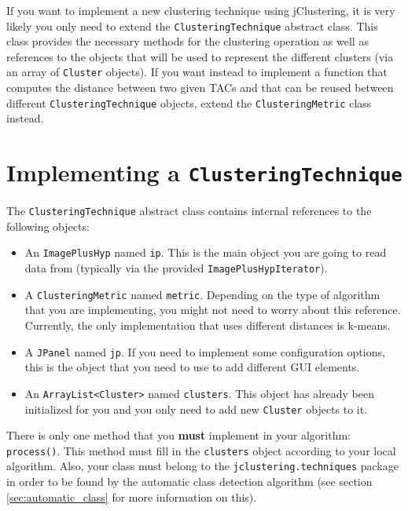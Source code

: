 \documentclass[11pt]{article} %
\begin{document}
If you want to implement a new clustering technique using jClustering, it is very likely you only need to extend the {\tt ClusteringTechnique} abstract class. This class provides the necessary methods for the clustering operation as well as references to the objects that will be used to represent the different clusters (via an array of {\tt Cluster} objects). If you want instead
to implement a function that computes the distance between two given TACs and that can be reused between different {\tt ClusteringTechnique} objects, extend the {\tt ClusteringMetric} class instead.

\section{Implementing a {\tt ClusteringTechnique}}
\label{sec:clusttech}

The {\tt ClusteringTechnique} abstract class contains internal references to the following objects:

\begin{itemize}
\item An {\tt ImagePlusHyp} named {\tt ip}. This is the main object you are going to read data from (typically via the provided {\tt ImagePlusHypIterator}).

\item A {\tt ClusteringMetric} named {\tt metric}. Depending on the type of algorithm that you are implementing, you might not need to worry about this reference. Currently, the only implementation that uses different distances is k-means.

\item A {\tt JPanel} named {\tt jp}. If you need to implement some configuration options, this is the object that you need to use to add different GUI elements.

\item An {\tt ArrayList<Cluster>} named {\tt clusters}. This object has already been initialized for you and you only need to add new {\tt Cluster} objects to it. 
\end{itemize}

There is only one method that you {\bf must} implement in your algorithm: {\tt process()}. This method must fill in the {\tt clusters} object according to your local algorithm. Also, your class must belong to the {\tt jclustering.techniques} package in order to be found by the automatic class detection algorithm (see section \ref{sec:automatic_class} for more information on this).
\end{document}
